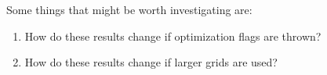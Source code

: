 \documentclass[12pt,english]{article}
\begin{document}
Some things that might be worth investigating are:
\begin{enumerate}
  \item How do these results change if optimization flags are thrown?
  \item How do these results change if larger grids are used?
\end{enumerate}
%
\end{document}
